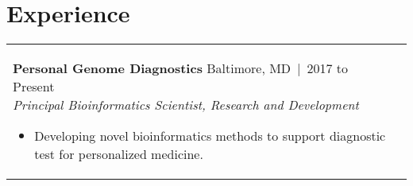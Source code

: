 \documentclass[11pt,letter,sans]{moderncv}
\makeatletter
\newenvironment{entrylistFive}{%
  \begin{longtable}{@{\extracolsep{\fill}}ll}
}{%
  \end{longtable}
}
\newcommand{\entryFive}[5]{%
  \parbox[t]{170mm}{%
    \textbf{#2}%
    \hfill%
    {\footnotesize #3~|~#1}\\%
	\emph{#4}\\%
    #5\vspace{\parsep}%
  }\\}
\makeatother
\begin{document}
\section{Experience}
\begin{entrylistFive}
\entryFive
{2017 to Present}
{Personal Genome Diagnostics}
{Baltimore, MD}
{Principal Bioinformatics Scientist, Research and Development}
{\vspace{-5mm}
\begin{itemize}
\item {Developing novel bioinformatics methods to support diagnostic test for personalized medicine.}
\end{itemize}
}

\entryFive
{2014 to 2017}
{National Human Genome Research Institute}
{Bethesda, MD}
{Postdoctoral Fellow, Laboratory of Dr. Francis S Collins}
{\vspace{-5mm}
\begin{itemize}
\item {Leveraged a large, multi-omics dataset to investigate epigenetic mechanisms underlying regulatory variants implicated in type 2 diabetes.}
\item {Developed machine-learning approaches for imputation of missing data in multi-omics experiments.}
\item {Investigated cell-to-cell variability in pancreatic islets, including responses to environmental perturbation, using single-cell gene expression and chromatin accessibility data.}
\item {Designed a novel sequencing assay for single-molecule resolution transcriptome analysis.}
\item {Developed Atropos, user-friendly software for QC and pre-processing of NGS reads. Created reproducible benchmark pipeline using software containers for accompanying publication.}
\item {Initiated collaborative project to undestand genomic diversity of biofilm communities.}
\item {Awarded six grants, including an American Diabetes Association fellowship and an NIH K22.}
\end{itemize}
}

\entryFive
{2016 to Present}
{American Academy of Bioinformatics}
{Bethesda, MD}
{Instructor of Bioinformatics}
{\vspace{-5mm}
\begin{itemize}
\item {Developed comprehensive, open-source course materials for workshops in DNA-Seq and RNA-Seq data analysis.}
\item {Taught workshops and earned highly positive student reviews.}
\end{itemize}
}


\end{entrylistFive}
\end{document}
